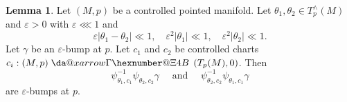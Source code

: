 \documentclass[reqno]{amsart}
\makeatletter
\newcommand*{\da@rightarrow}{\mathchar"0\hexnumber@\symAMSa 4B }
\newcommand*{\xdashrightarrow}[2][]{%
  \mathrel{%
    \mathpalette{\da@xarrow{#1}{#2}{}\da@rightarrow{\,}{}}{}%
  }%
}
\newcommand*{\da@xarrow}[7]{%
  \sbox0{$\ifx#7\scriptstyle\scriptscriptstyle\else\scriptstyle\fi#5#1#6\m@th$}%
  \sbox2{$\ifx#7\scriptstyle\scriptscriptstyle\else\scriptstyle\fi#5#2#6\m@th$}%
  \sbox4{$#7\dabar@\m@th$}%
  \dimen@=\wd0 %
  \ifdim\wd2 >\dimen@
    \dimen@=\wd2 %
  \fi
  \count@=2 %
  \def\da@bars{\dabar@\dabar@}%
  \@whiledim\count@\wd4<\dimen@\do{%
    \advance\count@\@ne
    \expandafter\def\expandafter\da@bars\expandafter{%
      \da@bars
      \dabar@ 
    }%
  }%
  \mathrel{#3}%
  \mathrel{%
    \mathop{\da@bars}\limits
    \ifx\\#1\\%
    \else
      _{\copy0}%
    \fi
    \ifx\\#2\\%
    \else
      ^{\copy2}%
    \fi
  }%
  \mathrel{#4}%
}
\def\eps{\varepsilon}
\theoremstyle{plain} \newtheorem{theorem} {Theorem}
\theoremstyle{definition} \newtheorem{definition} [theorem] {Definition}
\theoremstyle{itplain} %
\newtheorem{lemma}[theorem]{Lemma}
\numberwithin{equation}{section}
\numberwithin{theorem}{section}
\makeatother
\begin{document}
\begin{lemma}\label{lem:standard2:bumps-modulated-become-bumps}
  Let $(M, p)$ be a controlled pointed manifold.  Let $\theta_1, \theta_2 \in T_p^\wedge(M)$ and $\eps > 0$ with $\eps \lll 1$ and
  \begin{equation}\label{eq:epsth-thet-ll}
    \eps |\theta_1 - \theta_2| \ll 1, \quad
    \eps^2 |\theta_1| \ll 1,
    \quad
    \eps^2 |\theta_2| \ll 1.
  \end{equation}
  Let $\gamma$ be an $\eps$-bump at $p$.  Let $c_1$ and $c_2$ be controlled charts $c_i : (M,p) \xdashrightarrow{} (T_p(M), 0)$.  Then
  \begin{equation}\label{eq:psi_theta_1-c_1-1}
    \psi_{\theta_1,c_1}^{-1} \psi_{\theta_2, c_2} \gamma
    \quad
    \text{ and }
    \quad 
    \psi_{\theta_2,c_2}^{-1} \psi_{\theta_1, c_1} \gamma
  \end{equation}
  are $\eps$-bumps at $p$.
\end{lemma}
\end{document}
